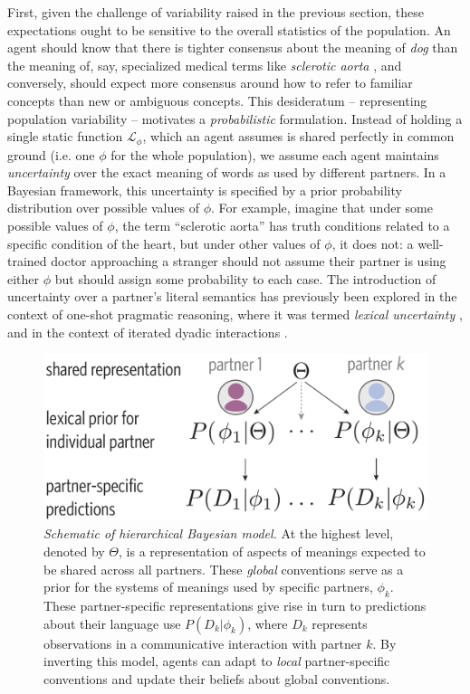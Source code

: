 First, given the challenge of variability raised in the previous section, these expectations ought to be sensitive to the overall statistics of the population. 
An agent should know that there is tighter consensus about the meaning of \emph{dog} than the meaning of, say, specialized medical terms like \emph{sclerotic aorta} \cite{Clark98_CommunalLexicons}, and conversely, should expect more consensus around how to refer to familiar concepts than new or ambiguous concepts.
This desideratum -- representing population variability -- motivates a \emph{probabilistic} formulation.
Instead of holding a single static function $\mathcal{L}_{\phi}$, which an agent assumes is shared perfectly in common ground (i.e. one $\phi$ for the whole population), we assume each agent maintains \emph{uncertainty} over the exact meaning of words as used by different partners.
In a Bayesian framework, this uncertainty is specified by a prior probability distribution over possible values of $\phi$.
For example, imagine that under some possible values of $\phi$, the term ``sclerotic aorta'' has truth conditions related to a specific condition of the heart, but under other values of $\phi$, it does not: a well-trained doctor approaching a stranger should not assume their partner is using either $\phi$ but should assign some probability to each case.
The introduction of uncertainty over a partner's literal semantics has previously been explored in the context of one-shot pragmatic reasoning, where it was termed \emph{lexical uncertainty} \cite{bergen_pragmatic_2016}, and in the context of iterated dyadic interactions \cite{SmithGoodmanFrank13_RecursivePragmaticReasoningNIPS}. 

\begin{figure}[b!]
\centering
\includegraphics[scale=0.35]{./figures/task1_model.pdf}
\vspace{.5em}
\caption{\emph{Schematic of hierarchical Bayesian model.} At the highest level, denoted by $\Theta$, is a representation of aspects of meanings expected to be shared across all partners. These \emph{global} conventions serve as a prior for the systems of meanings used by specific partners, $\phi_k$. These partner-specific representations give rise in turn to predictions about their language use $P(D_k|\phi_k)$, where $D_k$ represents observations in a communicative interaction with partner $k$. By inverting this model, agents can adapt to \emph{local} partner-specific conventions and update their beliefs about global conventions.}
\label{fig:model_schematic}
\end{figure}

